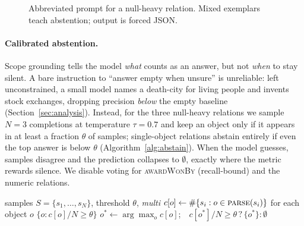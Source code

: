 \begin{figure}[t]
\centering\scriptsize\ttfamily
{}
\caption{Abbreviated prompt for a null-heavy relation. Mixed exemplars teach
abstention; output is forced JSON.}
\label{fig:prompt}
\end{figure}

\paragraph{Calibrated abstention.}
Scope grounding tells the model \emph{what} counts as an answer, but not
\emph{when} to stay silent. A bare instruction to ``answer empty when unsure'' is
unreliable: left unconstrained, a small model names a death-city for living people
and invents stock exchanges, dropping precision \emph{below} the empty baseline
(Section~\ref{sec:analysis}). Instead, for the three null-heavy relations we sample
$N{=}3$ completions at temperature $\tau{=}0.7$ and keep an object only if it
appears in at least a fraction $\theta$ of samples; single-object relations abstain
entirely if even the top answer is below $\theta$ (Algorithm~\ref{alg:abstain}).
When the model guesses, samples disagree and the prediction collapses to
$\emptyset$, exactly where the metric rewards silence. We disable voting for
\textsc{awardWonBy} (recall-bound) and the numeric relations.

\begin{algorithm}[t]
\small
\caption{\textsc{CalibratedAbstention}}
\label{alg:abstain}
\begin{algorithmic}[1]
\Require samples $S{=}\{s_1,\dots,s_N\}$, threshold $\theta$, \textit{multi}
\State $c[o] \gets \#\{s_i : o \in \textsc{parse}(s_i)\}$ for each object $o$
 \Return $\{o : c[o]/N \ge \theta\}$
\Else
  \State $o^* \gets \arg\max_o c[o]$;\ \ \Return $c[o^*]/N \ge \theta \,?\, \{o^*\} : \emptyset$
\EndIf
\end{algorithmic}
\end{algorithm}

